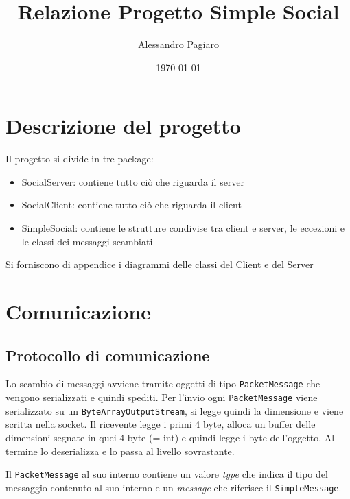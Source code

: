 \documentclass[]{article}
\begin{document}
\newcommand{\campo}[1]{\mathbb{#1}}

\title{Relazione Progetto Simple Social}
\author{Alessandro Pagiaro}
\date{\today}
\maketitle
\tableofcontents
	\pagebreak
\section{Descrizione del progetto}
Il progetto si divide in tre package:
\begin{itemize}
	\item SocialServer: contiene tutto ciò che riguarda il server
	\item SocialClient: contiene tutto ciò che riguarda il client
	\item SimpleSocial: contiene le strutture condivise tra client e server, le eccezioni e le classi dei messaggi scambiati
\end{itemize}

Si forniscono di appendice i diagrammi delle classi del Client e del Server

\section{Comunicazione}
\subsection{Protocollo di comunicazione}
	Lo scambio di messaggi avviene tramite oggetti di tipo \texttt{PacketMessage} che vengono serializzati e quindi spediti. Per l'invio ogni \texttt{PacketMessage} viene serializzato su un \texttt{ByteArrayOutputStream}, si legge quindi la dimensione e viene scritta nella socket. Il ricevente legge i primi 4 byte, alloca un buffer delle dimensioni segnate in quei 4 byte (= int) e quindi legge i byte dell'oggetto. Al termine lo deserializza e lo passa al livello sovrastante.
	
	Il \texttt{PacketMessage} al suo interno contiene un valore \textit{type} che indica il tipo del messaggio contenuto al suo interno e un \textit{message} che riferisce il \texttt{SimpleMessage}.
\end{document}
